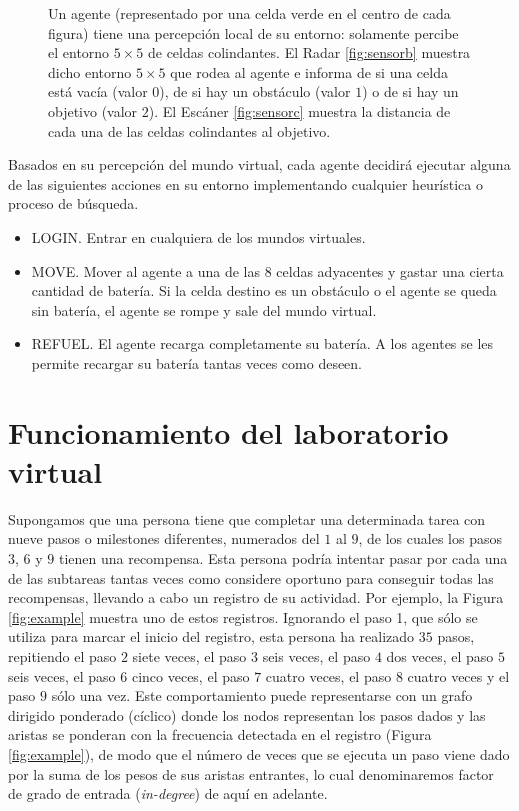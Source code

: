 \begin{figure}[H]
\begin{subfloat}[]
{
\label{fig:sensorc}
}       
\end{subfloat}
\caption{Un agente (representado por una celda verde en el centro de cada figura) tiene una percepción local de su entorno: solamente percibe el entorno $5 \times 5$ de celdas colindantes. El Radar \ref{fig:sensorb} muestra dicho entorno $5 \times 5$ que rodea al agente e informa de si una celda está vacía (valor $0$), de si hay un obstáculo (valor $1$) o de si hay un objetivo (valor $2$). El Escáner \ref{fig:sensorc} muestra la distancia de cada una de las celdas colindantes al objetivo.}
\label{fig:sensors}
\end{figure}

Basados en su percepción del mundo virtual, cada agente decidirá ejecutar alguna de las siguientes acciones en su entorno implementando cualquier heurística o proceso de búsqueda.

\begin{itemize}
	\item LOGIN. Entrar en cualquiera de los mundos virtuales.
	\item MOVE. Mover al agente a una de las $8$ celdas adyacentes y gastar una cierta cantidad de batería. Si la celda destino es un obstáculo o el agente se queda sin batería, el agente se rompe y sale del mundo  virtual.
	\item REFUEL. El agente recarga completamente su batería. A los agentes se les permite recargar su batería tantas veces como deseen.
\end{itemize}

\section{Funcionamiento del laboratorio virtual}\label{sec:funcionamiento}

Supongamos que una persona tiene que completar una determinada tarea con nueve pasos o milestones diferentes, numerados del $1$ al $9$, de los cuales los pasos $3$, $6$ y $9$ tienen una recompensa. Esta persona podría intentar pasar por cada una de las subtareas tantas veces como considere oportuno para conseguir todas las recompensas, llevando a cabo un registro de su actividad. Por ejemplo, la Figura \ref{fig:example} muestra uno de estos registros. Ignorando el paso 1, que sólo se utiliza para marcar el inicio del registro, esta persona ha realizado $35$ pasos, repitiendo el paso $2$ siete veces, el paso $3$ seis veces, el paso $4$ dos veces, el paso $5$ seis veces, el paso $6$ cinco veces, el paso $7$ cuatro veces, el paso $8$ cuatro veces y el paso $9$ sólo una vez. Este comportamiento puede representarse con un grafo dirigido ponderado (cíclico) donde los
nodos representan los pasos dados y las aristas se ponderan con la frecuencia detectada en el registro (Figura \ref{fig:example}), de modo que el número de veces que se ejecuta un paso viene dado por la suma de los pesos de sus aristas entrantes, lo cual denominaremos factor de grado de entrada (\emph{in-degree}) de aquí en adelante.


